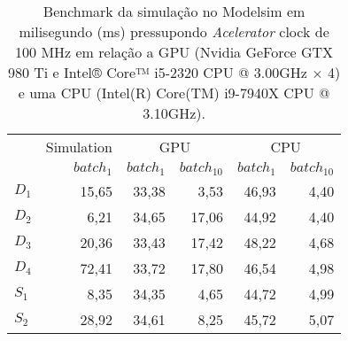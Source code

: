 \begin{table}[ht!]
\centering
\caption{Benchmark da simulação no Modelsim em milisegundo (ms) pressupondo \textit{Acelerator} clock de 100 MHz em relação a GPU (Nvidia GeForce GTX 980 Ti e Intel® Core™ i5-2320 CPU @ 3.00GHz × 4) e uma CPU (Intel(R) Core(TM) i9-7940X CPU @ 3.10GHz).}
\label{tab:5-cnn-benchmark}
\begin{tabular}{lrrrrr}
\toprule
 & Simulation & \multicolumn{2}{c}{GPU} & \multicolumn{2}{c}{CPU} \\
\cmidrule(lr){3-4} \cmidrule(l){5-6}
 & $batch_{1}$ & $batch_{1}$ & $batch_{10}$ & $batch_{1}$ & $batch_{10}$ \\
\midrule
$D_1$ & 15,65 & 33,38 & 3,53 & 46,93 & 4,40 \\
$D_2$ & 6,21 & 34,65 & 17,06 & 44,92 & 4,40 \\
$D_3$ & 20,36 & 33,43 & 17,42 & 48,22 & 4,68 \\
$D_4$ & 72,41 & 33,72 & 17,80 & 46,54 & 4,98 \\
$S_1$ & 8,35 & 34,35 & 4,65 & 44,72 & 4,99 \\
$S_2$ & 28,92 & 34,61 & 8,25 & 45,72 & 5,07 \\
\bottomrule
\end{tabular}
\end{table}